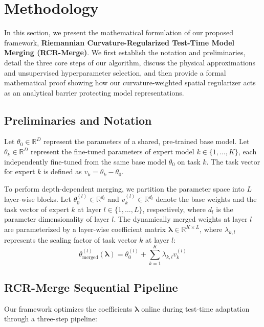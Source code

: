\section{Methodology}
\label{sec:method}

In this section, we present the mathematical formulation of our proposed framework, \textbf{Riemannian Curvature-Regularized Test-Time Model Merging (RCR-Merge)}. We first establish the notation and preliminaries, detail the three core steps of our algorithm, discuss the physical approximations and unsupervised hyperparameter selection, and then provide a formal mathematical proof showing how our curvature-weighted spatial regularizer acts as an analytical barrier protecting model representations.

\subsection{Preliminaries and Notation}
Let $\theta_0 \in \mathbb{R}^D$ represent the parameters of a shared, pre-trained base model. Let $\theta_k \in \mathbb{R}^D$ represent the fine-tuned parameters of expert model $k \in \{1, \dots, K\}$, each independently fine-tuned from the same base model $\theta_0$ on task $k$. The task vector for expert $k$ is defined as $v_k = \theta_k - \theta_0$.

To perform depth-dependent merging, we partition the parameter space into $L$ layer-wise blocks. Let $\theta_0^{(l)} \in \mathbb{R}^{d_l}$ and $v_k^{(l)} \in \mathbb{R}^{d_l}$ denote the base weights and the task vector of expert $k$ at layer $l \in \{1, \dots, L\}$, respectively, where $d_l$ is the parameter dimensionality of layer $l$. The dynamically merged weights at layer $l$ are parameterized by a layer-wise coefficient matrix $\boldsymbol{\lambda} \in \mathbb{R}^{K \times L}$, where $\lambda_{k, l}$ represents the scaling factor of task vector $k$ at layer $l$:
\begin{equation}
\label{eq:merged_weights}
\theta_{\text{merged}}^{(l)}(\boldsymbol{\lambda}) = \theta_0^{(l)} + \sum_{k=1}^K \lambda_{k, l} v_{k}^{(l)}
\end{equation}

\subsection{RCR-Merge Sequential Pipeline}

Our framework optimizes the coefficients $\boldsymbol{\lambda}$ online during test-time adaptation through a three-step pipeline:


